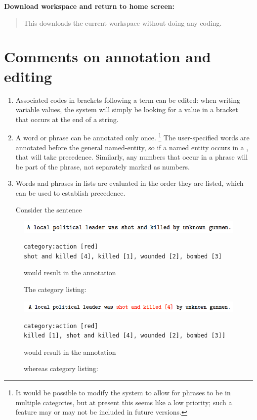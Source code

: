\documentclass[letterpaper,10pt,english]{sphinxmanual}
\begin{document}
\textbf{Download workspace and return to home screen:}
\begin{quote}

This downloads the current workspace without doing any coding.
\end{quote}


\section{Comments on annotation and editing}
\label{annotation:comments-on-annotation-and-editing}\begin{enumerate}
\item {} 
Associated codes in brackets following a term can be edited: when
writing variable values, the system will simply be looking for a
value in a bracket that occurs at the end of a string.

\item {} 
A word or phrase can be annotated only once. \footnote{
It would be possible to modify the system to allow for phrases to be
in multiple categories, but at present this seems like a low
priority; such a feature may or may not be included in future
versions.
} The user-specified
 words are annotated before the general named-entity, so
if a named entity occurs in a , that will take
precedence. Similarly, any numbers that occur in a 
phrase will be part of the phrase, not separately marked as numbers.

\item {} 
Words and phrases in  lists are evaluated in the order
they are listed, which can be used to establish precedence.

Consider the sentence

\end{enumerate}
\begin{figure}[htbp]
\centering
\capstart

\includegraphics{annotation0.png}
\caption{The category listing:}{\small 
\begin{Verbatim}[commandchars=\\\{\}]
category:action [red]
shot and killed [4], killed [1], wounded [2], bombed [3]
\end{Verbatim}

would result in the annotation
}\end{figure}
\begin{figure}[htbp]
\centering
\capstart

\includegraphics{annotation1.png}
\caption{whereas category listing:}{\small 
\begin{Verbatim}[commandchars=\\\{\}]
category:action [red]
killed [1], shot and killed [4], wounded [2], bombed [3]]
\end{Verbatim}

would result in the annotation
}\end{figure}
\end{document}
